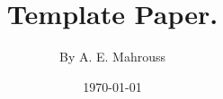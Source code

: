 \documentclass[10pt]{article}
\title{%
	\vspace{-1.5em}%
	\large\textbf{Template Paper.}%
}
\author{By A. E. Mahrouss}
\date{\today}
\theoremstyle{plain}
\theoremstyle{definition}
\theoremstyle{remark}
\begin{document}

\maketitle
\tableofcontents
\newpage

\nocite{*}


\end{document}
